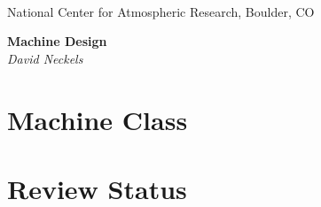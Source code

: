 \documentclass[]{article}
\begin{document}

\begin{titlepage}

\begin{latexonly}
 \\
\noindent National Center for Atmospheric Research, Boulder, CO \\
\vspace{2in}
\end{latexonly}

\begin{center}
{\Large\bf Machine Design} \\
\medskip
{\it David Neckels}
\end{center}

\end{titlepage}

\tableofcontents

\newpage




\section{Machine Class}

%







\section{Review Status}

 \\
\end{document}
